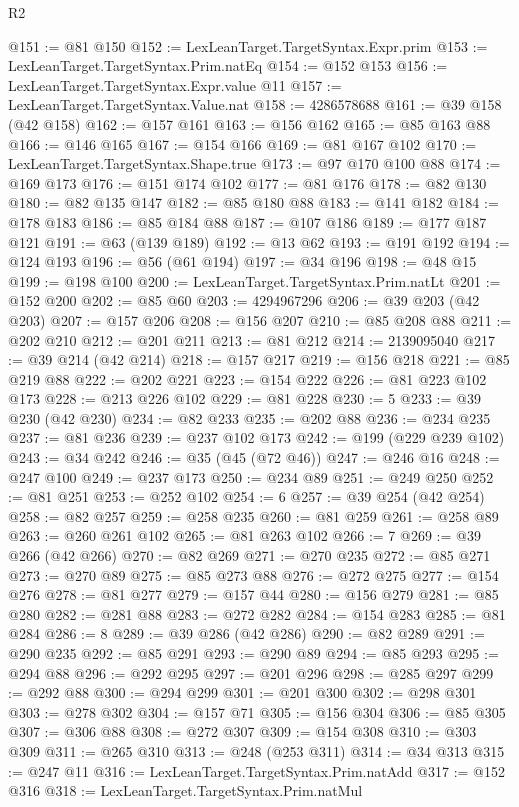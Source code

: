\begin{lexlean}{R2}
\begin{coremodule}
@151 := @81 @150
@152 := LexLeanTarget.TargetSyntax.Expr.prim
@153 := LexLeanTarget.TargetSyntax.Prim.natEq
@154 := @152 @153
@156 := LexLeanTarget.TargetSyntax.Expr.value @11
@157 := LexLeanTarget.TargetSyntax.Value.nat
@158 := 4286578688
@161 := @39 @158 (@42 @158)
@162 := @157 @161
@163 := @156 @162
@165 := @85 @163 @88
@166 := @146 @165
@167 := @154 @166
@169 := @81 @167 @102
@170 := LexLeanTarget.TargetSyntax.Shape.true
@173 := @97 @170 @100 @88
@174 := @169 @173
@176 := @151 @174 @102
@177 := @81 @176
@178 := @82 @130
@180 := @82 @135 @147
@182 := @85 @180 @88
@183 := @141 @182
@184 := @178 @183
@186 := @85 @184 @88
@187 := @107 @186
@189 := @177 @187 @121
@191 := @63 (@139 @189)
@192 := @13 @62
@193 := @191 @192
@194 := @124 @193
@196 := @56 (@61 @194)
@197 := @34 @196
@198 := @48 @15
@199 := @198 @100
@200 := LexLeanTarget.TargetSyntax.Prim.natLt
@201 := @152 @200
@202 := @85 @60
@203 := 4294967296
@206 := @39 @203 (@42 @203)
@207 := @157 @206
@208 := @156 @207
@210 := @85 @208 @88
@211 := @202 @210
@212 := @201 @211
@213 := @81 @212
@214 := 2139095040
@217 := @39 @214 (@42 @214)
@218 := @157 @217
@219 := @156 @218
@221 := @85 @219 @88
@222 := @202 @221
@223 := @154 @222
@226 := @81 @223 @102 @173
@228 := @213 @226 @102
@229 := @81 @228
@230 := 5
@233 := @39 @230 (@42 @230)
@234 := @82 @233
@235 := @202 @88
@236 := @234 @235
@237 := @81 @236
@239 := @237 @102 @173
@242 := @199 (@229 @239 @102)
@243 := @34 @242
@246 := @35 (@45 (@72 @46))
@247 := @246 @16
@248 := @247 @100
@249 := @237 @173
@250 := @234 @89
@251 := @249 @250
@252 := @81 @251
@253 := @252 @102
@254 := 6
@257 := @39 @254 (@42 @254)
@258 := @82 @257
@259 := @258 @235
@260 := @81 @259
@261 := @258 @89
@263 := @260 @261 @102
@265 := @81 @263 @102
@266 := 7
@269 := @39 @266 (@42 @266)
@270 := @82 @269
@271 := @270 @235
@272 := @85 @271
@273 := @270 @89
@275 := @85 @273 @88
@276 := @272 @275
@277 := @154 @276
@278 := @81 @277
@279 := @157 @44
@280 := @156 @279
@281 := @85 @280
@282 := @281 @88
@283 := @272 @282
@284 := @154 @283
@285 := @81 @284
@286 := 8
@289 := @39 @286 (@42 @286)
@290 := @82 @289
@291 := @290 @235
@292 := @85 @291
@293 := @290 @89
@294 := @85 @293
@295 := @294 @88
@296 := @292 @295
@297 := @201 @296
@298 := @285 @297
@299 := @292 @88
@300 := @294 @299
@301 := @201 @300
@302 := @298 @301
@303 := @278 @302
@304 := @157 @71
@305 := @156 @304
@306 := @85 @305
@307 := @306 @88
@308 := @272 @307
@309 := @154 @308
@310 := @303 @309
@311 := @265 @310
@313 := @248 (@253 @311)
@314 := @34 @313
@315 := @247 @11
@316 := LexLeanTarget.TargetSyntax.Prim.natAdd
@317 := @152 @316
@318 := LexLeanTarget.TargetSyntax.Prim.natMul

\end{coremodule}
\end{lexlean}
